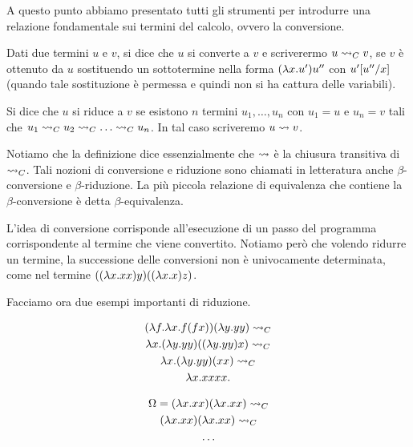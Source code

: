 \documentclass[]{marticle}
\begin{document}
A questo punto abbiamo presentato tutti gli strumenti per introdurre una
relazione fondamentale sui termini del calcolo, ovvero la conversione.

\begin{block}[Definizione]
    Dati due termini $u$ e $v$, si dice che $u$ si converte a $v$ e scriverermo
    $u \rightsquigarrow_C v$, se $v$ \`e ottenuto da $u$ sostituendo un sottotermine nella
    forma $(\lambda x. u')u''$ con $u'[u''/x]$ (quando tale sostituzione \`e
    permessa e quindi non si ha cattura delle variabili).

    Si dice che $u$ si riduce a $v$ se esistono $n$ termini $u_1, \dots, u_n$
    con $u_1 = u$ e $u_n = v$ tali che $u_1 \conv_C u_2 \conv_C \dots \conv_C
    u_n$. In tal caso scriveremo $u\rightsquigarrow v$.
\end{block}

Notiamo che la definizione dice essenzialmente che $\rightsquigarrow$ \`e la chiusura
transitiva di $\rightsquigarrow_C$. Tali nozioni di conversione e riduzione sono chiamati
in letteratura anche $\beta$-conversione e $\beta$-riduzione. La pi\`u piccola
relazione di equivalenza che contiene la $\beta$-conversione \`e detta
$\beta$-equivalenza.

L'idea di conversione corrisponde all'esecuzione di un passo del programma
corrispondente al termine che viene convertito. Notiamo per\`o che volendo
ridurre un termine, la successione delle conversioni non \`e univocamente
determinata, come nel termine $((\lambda x .xx)y)((\lambda x.x)z)$.

Facciamo ora due esempi importanti di riduzione.

\begin{block}[Esempio]
    \begin{gather*}
        (\lambda f . \lambda x . f(fx))(\lambda y. yy) \rightsquigarrow_C  \\
        \lambda x. (\lambda y. yy)((\lambda y.yy) x) \rightsquigarrow_C \\
        \lambda x .(\lambda y. yy)(xx) \rightsquigarrow_C \\
        \lambda x. xxxx.
    \end{gather*}
\end{block}

\begin{block}[Esempio]
    \label{omega}
    \begin{gather*}
        \Omega = (\lambda x.xx)(\lambda x.xx) \rightsquigarrow_C \\ 
        (\lambda x.xx)(\lambda x.xx) \rightsquigarrow_C \\
        \dots
    \end{gather*}
\end{block}
\end{document}
